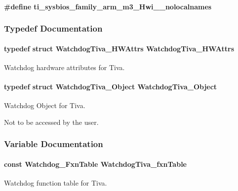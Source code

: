 \paragraph[{ti\+\_\+sysbios\+\_\+family\+\_\+arm\+\_\+m3\+\_\+\+Hwi\+\_\+\+\_\+nolocalnames}]{\setlength{\rightskip}{0pt plus 5cm}\#define ti\+\_\+sysbios\+\_\+family\+\_\+arm\+\_\+m3\+\_\+\+Hwi\+\_\+\+\_\+nolocalnames}\label{_watchdog_tiva_8h_aaa17ecf48f5762e2e1bdb0bab8aacf0c}


\subsubsection{Typedef Documentation}
\paragraph[{Watchdog\+Tiva\+\_\+\+H\+W\+Attrs}]{\setlength{\rightskip}{0pt plus 5cm}typedef struct {\bf Watchdog\+Tiva\+\_\+\+H\+W\+Attrs}  {\bf Watchdog\+Tiva\+\_\+\+H\+W\+Attrs}}\label{_watchdog_tiva_8h_a7f1c7128705fb9a8435812e14f103fc1}


Watchdog hardware attributes for Tiva. 

\paragraph[{Watchdog\+Tiva\+\_\+\+Object}]{\setlength{\rightskip}{0pt plus 5cm}typedef struct {\bf Watchdog\+Tiva\+\_\+\+Object}  {\bf Watchdog\+Tiva\+\_\+\+Object}}\label{_watchdog_tiva_8h_a59414cac1ebd2580c3475ac6d7f24342}


Watchdog Object for Tiva. 

Not to be accessed by the user. 

\subsubsection{Variable Documentation}
\paragraph[{Watchdog\+Tiva\+\_\+fxn\+Table}]{\setlength{\rightskip}{0pt plus 5cm}const {\bf Watchdog\+\_\+\+Fxn\+Table} Watchdog\+Tiva\+\_\+fxn\+Table}\label{_watchdog_tiva_8h_ae03e6ed51cc78abdf88691959865c2e2}


Watchdog function table for Tiva. 

